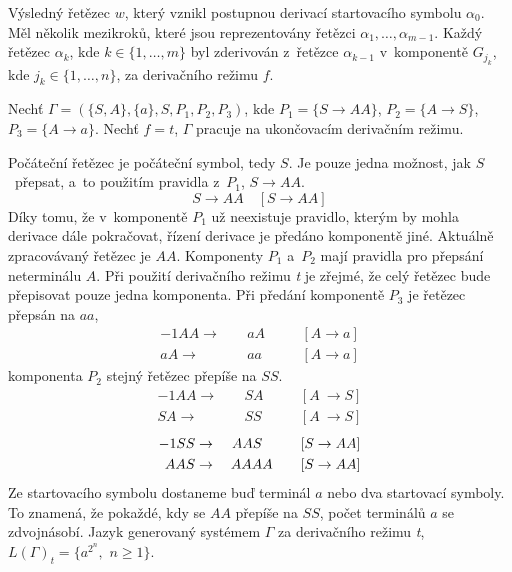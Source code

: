 Výsledný řetězec $w$, který vznikl postupnou derivací startovacího symbolu $\alpha_0$.
Měl několik mezikroků, které jsou reprezentovány řetězci $\alpha_1, \ldots, \alpha_{m-1}$.
Každý řetězec $\alpha_k$, kde $k \in \{1, \ldots, m\}$ byl zderivován z~řetězce $\alpha_{k-1}$ v~komponentě $G_{j_{k}}$, kde $j_k \in \{1, \ldots, n\}$, za derivačního režimu $f$.

\begin{example}
    Nechť $\Gamma = (\{S, A\}, \{a\}, S, P_1, P_2, P_3)$, kde $P_1 = \{S \rightarrow AA\}$, $P_2 = \{A \rightarrow S\}$, $P_3 = \{A \rightarrow a\}$.
    Nechť $f = t$, $\Gamma$ pracuje na ukončovacím derivačním režimu.

    Počáteční řetězec je počáteční symbol, tedy $S$. 
    Je pouze jedna možnost, jak $S$~přepsat, a~to použitím pravidla z~$P_1$, $S \rightarrow AA$.
    \begin{equation*}
        S \rightarrow AA \quad [S \rightarrow AA]
    \end{equation*}
    Díky tomu, že v~komponentě $P_1$ už neexistuje pravidlo, kterým by mohla derivace dále pokračovat, řízení derivace je předáno komponentě jiné.
    Aktuálně zpracovávaný řetězec je $AA$.
    Komponenty $P_1$ a~$P_2$ mají pravidla pro přepsání neterminálu $A$.
    Při použití derivačního režimu \emph{t} je zřejmé, že celý řetězec bude přepisovat pouze jedna komponenta.
    Při předání komponentě $P_3$ je řetězec přepsán na $aa$,
    \begin{alignat*}{-1}
        AA \rightarrow&&\; aA \quad &&[A \rightarrow a] \\
        aA \rightarrow&&\; aa \,\quad &&[A \rightarrow a]
    \end{alignat*}
    komponenta $P_2$ stejný řetězec přepíše na $SS$.
    \begin{alignat*}{-1}
        AA  \rightarrow&&\; SA && \quad [A~\rightarrow S] \\
        SA  \rightarrow&&\; SS && \quad [A~\rightarrow S] 
    \end{alignat*}
    \begin{alignat*}{-1}
         SS \rightarrow&&\; AAS  \hphantom{A} \quad  &&[S \rightarrow AA] \\ 
        AAS \rightarrow&&\; AAAA \quad &&[S \rightarrow AA]
    \end{alignat*}
    Ze startovacího symbolu dostaneme buď terminál $a$ nebo dva startovací symboly.
    To znamená, že pokaždé, kdy se $AA$ přepíše na $SS$, počet terminálů $a$ se zdvojnásobí.
    Jazyk generovaný systémem $\Gamma$ za derivačního režimu \emph{t}, $L(\Gamma)_t = \{a^{2^n},$ $n \geq 1 \}$.
\end{example}

